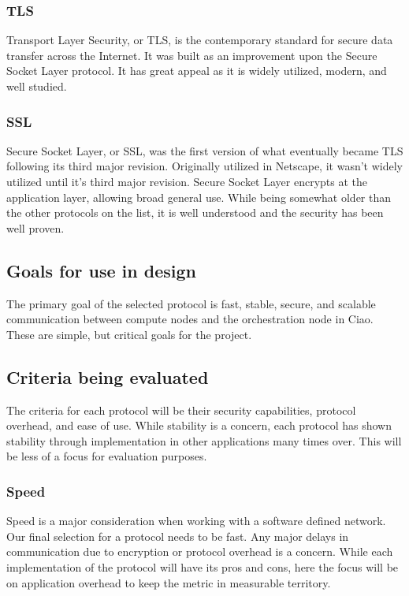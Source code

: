 \documentclass[10pt,letterpaper,onecolumn,draftclsnofoot]{IEEEtran}
\begin{document}
\subsubsection{TLS}
Transport Layer Security, or TLS, is the contemporary standard for secure data
transfer across the Internet. It was built as an improvement upon the Secure
Socket Layer protocol. It has great appeal as it is widely utilized, modern,
and well studied.\cite{tls}

\subsubsection{SSL}
Secure Socket Layer, or SSL, was the first version of what eventually became
TLS following its third major revision. Originally utilized in Netscape, it
wasn't widely utilized until it's third major revision. Secure Socket Layer
encrypts at the application layer, allowing broad general use. While being
somewhat older than the other protocols on the list, it is well understood and
the security has been well proven.\cite{ssl}

\subsection{Goals for use in design}
The primary goal of the selected protocol is fast, stable, secure, and
scalable communication between compute nodes and the orchestration node in
Ciao. These are simple, but critical goals for the project.

\subsection{Criteria being evaluated}
The criteria for each protocol will be their security capabilities, protocol
overhead, and ease of use. While stability is a concern, each protocol has
shown stability through implementation in other applications many times over.
This will be less of a focus for evaluation purposes.

\subsubsection{Speed}
Speed is a major consideration when working with a software defined network.
Our final selection for a protocol needs to be fast. Any major delays in
communication due to encryption or protocol overhead is a concern. While each
implementation of the protocol will have its pros and cons, here the focus
will be on application overhead to keep the metric in measurable territory.
\end{document}
